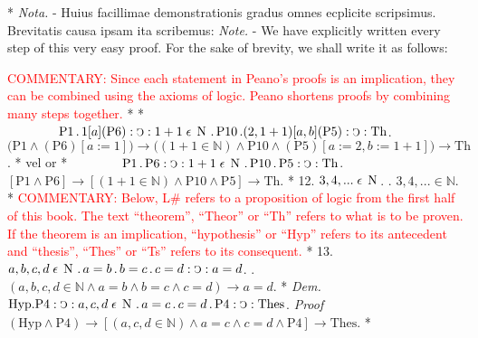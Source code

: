\documentclass{book}
\newcommand{\C}{\mathop{\sbox0{$\displaystyle$$\reflectbox{C}$} %
\raisebox{-\height+\ht0-0.05cm}[\ht0][\dp0]{\scalebox{0.8}[0.8]{\copy0}}}\displaylimits} %
\newcommand{\p}{\mathop{\sbox0{$\displaystyle$$.$}
\raisebox{-\height+\ht0}[\ht0][\dp0]{\scalebox{1}[1]{\copy0}}}\displaylimits} %
\newcommand{\smallIn}{\ensuremath{\mathrel{\epsilon}}}
\newcommand{\N}{\mathop{\thinspace \text{N} \thinspace}}
\newcommand\commentary[1]{\textcolor{red}{COMMENTARY: #1}}
\newenvironment{translateTwoCol}
               { %
                 \columnratio{0.5, 0.5}
                 \begin{paracol}{2}
                 \newcommand{\LAT}{\switchcolumn[0]*}
                 \newcommand{\ENG}{\switchcolumn[1]}
               }
               { %
                 \let\ENG\undefined
                 \let\LAT\undefined
                 \end{paracol}
               }
\begin{document}
\begin{translateTwoCol}
\vspace{1em}
\ENG
\vspace{1em}
\LAT
\emph{Nota.} - Huius facillimae demonstrationis gradus omnes ecplicite scripsimus. Brevitatis causa ipsam ita scribemus:
\ENG
\emph{Note.} - We have explicitly written every step of this very easy proof. For the sake of brevity, we shall write it as follows:

\commentary{Since each statement in Peano's proofs is an implication, they can be combined using the axioms of logic.  Peano shortens proofs by combining many steps together.}
\LAT
\vspace{1em}
\ENG
\vspace{1em}
\LAT
$\hspace{1.4cm} \text{P1} \p 1 [a] (\text{P6}) : \C : 1 +1 \smallIn \N \p \text{P10} \p (2, 1+1) [a, b] (\text{P5}) : \C : \text{Th}$.
\ENG
$\Big( \text{P1} \wedge (\text{P6})[a:=1] \Big) \rightarrow \Big( (1 + 1 \in \mathbb{N}) \wedge \text{P10} \wedge (\text{P5})[a:=2,b:=1+1] \Big) \rightarrow \text{Th}$.
\LAT
vel
\ENG
or
\LAT
$\hspace{1.4cm} \text{P1} \p \text{P6} : \C : 1 + 1 \smallIn \N \p \text{P10} \p \text{P5} : \C : \text{Th}$.
\ENG
$[\text{P1} \wedge \text{P6}] \rightarrow [(1 + 1 \in \mathbb{N}) \wedge \text{P10} \wedge \text{P5}] \rightarrow \text{Th}$.
\LAT
12. \hspace{0.67cm} $3, 4,... \smallIn \N$.
\ENG
12. \hspace{0.67cm} $3, 4, ... \in \mathbb{N}$.
\LAT
\ENG
\commentary{Below, L\# refers to a proposition of logic from the first half of this book.  The text ``theorem'', ``Theor'' or ``Th'' refers to what is to be proven.  If the theorem is an implication, ``hypothesis'' or ``Hyp'' refers to its antecedent and ``thesis'', ``Thes'' or ``Ts'' refers to its consequent.}
\LAT
13. \hspace{0.67cm} $a,b,c,d \smallIn \N \p a = b \p b = c \p c = d : \C : a = d$.
\ENG
13. \hspace{0.67cm} $(a,b,c,d \in \mathbb{N} \wedge a = b \wedge b = c \wedge c = d ) \rightarrow a = d$.
\LAT
\emph{Dem.} \hspace{0.27cm} $\text{Hyp} . \text{P4} : \C : a,c,d \smallIn \N \p a = c \p c = d \p \text{P4} : \C : \text{Thes}$.
\ENG
\emph{Proof} \hspace{0.27cm} $(\text{Hyp} \wedge \text{P4}) \rightarrow [(a,c,d \in \mathbb{N}) \wedge a = c \wedge c = d \wedge \text{P4} ] \rightarrow \text{Thes}$.
\LAT

\end{translateTwoCol}
\end{document}

